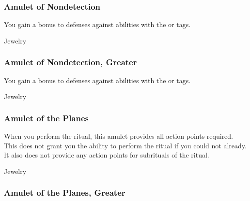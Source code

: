 \lowercase{\hypertarget{item:Amulet of Nondetection}{}}\label{item:Amulet of Nondetection}
\hypertarget{item:Amulet of Nondetection}{\subsubsection{Amulet of Nondetection\hfill{}}}

You gain a  bonus to defenses against abilities with the  or  tags.



 


 Jewelry


\lowercase{\hypertarget{item:Amulet of Nondetection, Greater}{}}\label{item:Amulet of Nondetection, Greater}
\hypertarget{item:Amulet of Nondetection, Greater}{\subsubsection{Amulet of Nondetection, Greater\hfill{}}}

You gain a  bonus to defenses against abilities with the  or  tags.



 


 Jewelry


\lowercase{\hypertarget{item:Amulet of the Planes}{}}\label{item:Amulet of the Planes}
\hypertarget{item:Amulet of the Planes}{\subsubsection{Amulet of the Planes\hfill{}}}

When you perform the  ritual, this amulet provides all action points required.
This does not grant you the ability to perform the  ritual if you could not already.
It also does not provide any action points for subrituals of the  ritual.



 


 Jewelry


\lowercase{\hypertarget{item:Amulet of the Planes, Greater}{}}\label{item:Amulet of the Planes, Greater}
\hypertarget{item:Amulet of the Planes, Greater}{\subsubsection{Amulet of the Planes, Greater\hfill{}}}

